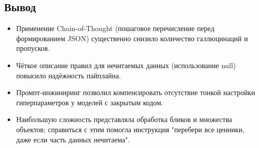 \subsection{Вывод}
\begin{itemize}
	\item Применение Chain-of-Thought (пошаговое перечисление перед формированием JSON) существенно снизило количество галлюцинаций и пропусков.
	\item Чёткое описание правил для нечитаемых данных (использование null) повысило надёжность пайплайна.
	\item Промпт-инжиниринг позволил компенсировать отсутствие тонкой настройки гиперпараметров у моделей с закрытым кодом.
	\item Наибольшую сложность представляла обработка бликов и множества объектов; справиться с этим помогла инструкция "перебери все ценники, даже если часть данных нечитаема".
\end{itemize}